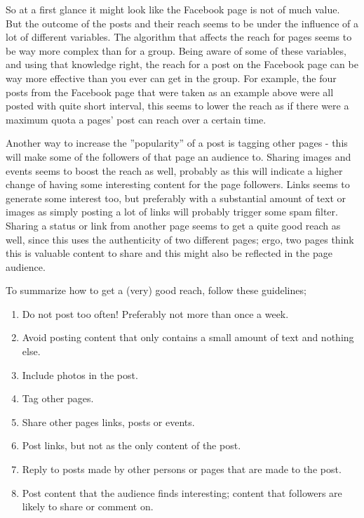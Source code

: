 \documentclass[12pt,a4paper]{article}
\begin{document}
			So at a first glance it might look like the Facebook page is not of much value. But the outcome of the posts and their reach seems to be under the influence of a lot of different variables. The algorithm that affects the reach for pages seems to be way more complex than for a group. Being aware of some of these variables, and using that knowledge right, the reach for a post on the Facebook page can be way more effective than you ever can get in the group. For example, the four posts from the Facebook page that were taken as an example above were all posted with quite short interval, this seems to lower the reach as if there were a maximum quota a pages' post can reach over a certain time.

			Another way to increase the ''popularity'' of a post is tagging other pages - this will make some of the followers of that page an audience to. Sharing images and events seems to boost the reach as well, probably as this will indicate a higher change of having some interesting content for the page followers. Links seems to generate some interest too, but preferably with a substantial amount of text or images as simply posting a lot of links will probably trigger some spam filter. Sharing a status or link from another page seems to get a quite good reach as well, since this uses the authenticity of two different pages; ergo, two pages think this is valuable content to share and this might also be reflected in the page audience.

			To summarize how to get a (very) good reach, follow these guidelines;
			\begin{enumerate}
				\item Do not post too often! Preferably not more than once a week.
				\item Avoid posting content that only contains a small amount of text and nothing else.
				\item Include photos in the post.
				\item Tag other pages.
				\item Share other pages links, posts or events.
				\item Post links, but not as the only content of the post.
				\item Reply to posts made by other persons or pages that are made to the post.
				\item Post content that the audience finds interesting; content that followers are likely to share or comment on.
			\end{enumerate}
\end{document}
